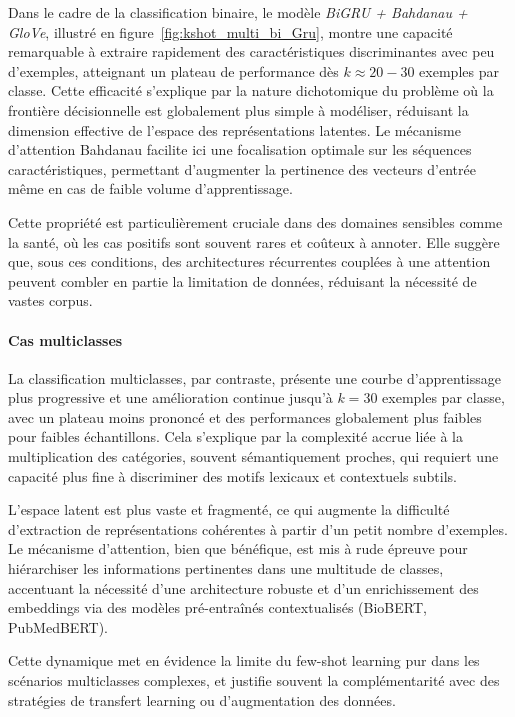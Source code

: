 \documentclass[12pt]{report}
\begin{document}
Dans le cadre de la classification binaire, le modèle \textit{BiGRU + Bahdanau + GloVe}, illustré en figure~\ref{fig:kshot_multi_bi_Gru}, montre une capacité remarquable à extraire rapidement des caractéristiques discriminantes avec peu d’exemples, atteignant un plateau de performance dès \( k \approx 20-30 \) exemples par classe. Cette efficacité s’explique par la nature dichotomique du problème où la frontière décisionnelle est globalement plus simple à modéliser, réduisant la dimension effective de l’espace des représentations latentes. Le mécanisme d’attention Bahdanau facilite ici une focalisation optimale sur les séquences caractéristiques, permettant d’augmenter la pertinence des vecteurs d’entrée même en cas de faible volume d’apprentissage.

Cette propriété est particulièrement cruciale dans des domaines sensibles comme la santé, où les cas positifs sont souvent rares et coûteux à annoter. Elle suggère que, sous ces conditions, des architectures récurrentes couplées à une attention peuvent combler en partie la limitation de données, réduisant la nécessité de vastes corpus.

\paragraph{Cas multiclasses}

La classification multiclasses, par contraste, présente une courbe d’apprentissage plus progressive et une amélioration continue jusqu’à \( k=30 \) exemples par classe, avec un plateau moins prononcé et des performances globalement plus faibles pour faibles échantillons. Cela s’explique par la complexité accrue liée à la multiplication des catégories, souvent sémantiquement proches, qui requiert une capacité plus fine à discriminer des motifs lexicaux et contextuels subtils.

L’espace latent est plus vaste et fragmenté, ce qui augmente la difficulté d’extraction de représentations cohérentes à partir d’un petit nombre d’exemples. Le mécanisme d’attention, bien que bénéfique, est mis à rude épreuve pour hiérarchiser les informations pertinentes dans une multitude de classes, accentuant la nécessité d’une architecture robuste et d’un enrichissement des embeddings via des modèles pré-entraînés contextualisés (BioBERT, PubMedBERT).

Cette dynamique met en évidence la limite du few-shot learning pur dans les scénarios multiclasses complexes, et justifie souvent la complémentarité avec des stratégies de transfert learning ou d’augmentation des données.
\end{document}

